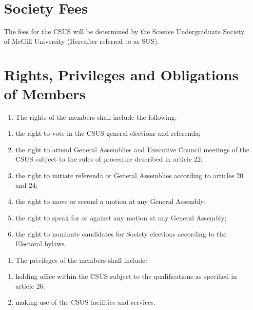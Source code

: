 \section{Society Fees}\label{society-fees}

The fees for the CSUS will be determined by the Science Undergraduate
Society of McGill University (Hereafter referred to as SUS).

\section{Rights, Privileges and Obligations of
Members}\label{rights-privileges-and-obligations-of-members}

\begin{enumerate}
\def\labelenumi{\arabic{enumi}.}
\tightlist
\item
  The rights of the members shall include the following:
\end{enumerate}

\begin{enumerate}
\def\labelenumi{(\alph{enumi})}
\tightlist
\item
  the right to vote in the CSUS general elections and referenda;
\item
  the right to attend General Assemblies and Executive Council meetings
  of the CSUS subject to the rules of procedure described in article 22;
\item
  the right to initiate referenda or General Assemblies according to
  articles 20 and 24;
\item
  the right to move or second a motion at any General Assembly;
\item
  the right to speak for or against any motion at any General Assembly;
\item
  the right to nominate candidates for Society elections according to
  the Electoral bylaws.
\end{enumerate}

\begin{enumerate}
\def\labelenumi{\arabic{enumi}.}
\setcounter{enumi}{1}
\tightlist
\item
  The privileges of the members shall include:
\end{enumerate}

\begin{enumerate}
\def\labelenumi{(\alph{enumi})}
\tightlist
\item
  holding office within the CSUS subject to the qualifications as
  specified in article 26;
\item
  making use of the CSUS facilities and services.
\end{enumerate}

